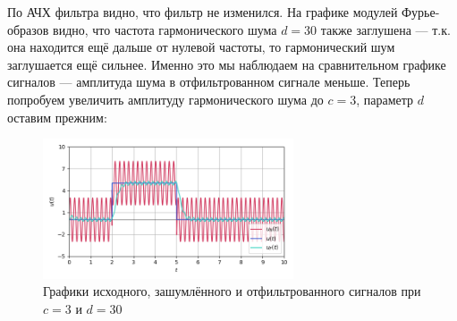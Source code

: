 \documentclass[a4paper]{article}
\begin{document}
По АЧХ фильтра видно, что фильтр не изменился. На графике модулей Фурье-образов видно, что частота гармонического шума $d = 30$ также заглушена --- т.к. она находится ещё дальше от нулевой частоты, то гармонический шум заглушается ещё сильнее. Именно это мы наблюдаем на сравнительном графике сигналов --- амплитуда шума в отфильтрованном сигнале меньше. \newpage
Теперь попробуем увеличить амплитуду гармонического шума до $c = 3$, параметр $d$ оставим прежним:
\begin{figure}[H]
    \centering \includegraphics[width=0.66\textwidth]{sources/second/part2/c=3_d=30 T1=1e-08_T2=0.111_T3=0.111/1_signal_cmp.png}
    \caption{Графики исходного, зашумлённого и отфильтрованного сигналов при $c = 3$ и $d = 30$}
\end{figure}\vspace{-1em}
\end{document}
